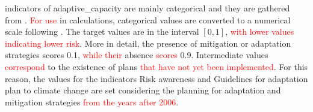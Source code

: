 \Glspl{indicator} of \gls{adaptive_capacity} are mainly categorical and they are gathered from \cite[66-79]{2015PudduCorporateSocial}. \textcolor{red}{For use} in calculations, categorical values are converted to a numerical scale following \cite[6]{2023DeVivoClimate-RiskAssessment}. The target values are in the interval $[0, 1]$, \textcolor{red}{with lower values indicating lower \gls{risk}}. More in detail, the presence of mitigation or adaptation strategies scores \num{0.1}, \textcolor{red}{while their} absence \textcolor{red}{scores} \num{0.9}. Intermediate values \textcolor{red}{correspond} to the existence of plans \textcolor{red}{that have not yet been implemented}. For this reason, the values for the indicators {Risk awareness} and {Guidelines for adaptation plan to climate change} are set considering the planning for adaptation and mitigation strategies \textcolor{red}{from the years after 2006}.
